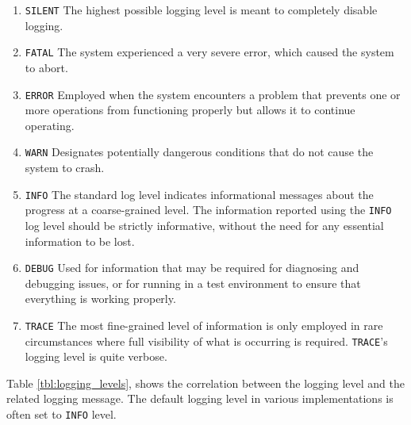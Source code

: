 \begin{enumerate}
  \item[\protect\icircled{\texttt{7}}] \texttt{SILENT}
    \newline
    The highest possible logging level is meant to completely disable logging.

  \item[\protect\icircled{\texttt{6}}] \texttt{FATAL}
    \newline
    The system experienced a very severe error, which caused the system to abort.

  \item[\protect\icircled{\texttt{5}}] \texttt{ERROR}
    \newline
    Employed when the system encounters a problem that prevents one or more operations
    from functioning properly but allows it to continue operating.

  \item[\protect\icircled{\texttt{4}}] \texttt{WARN}
    \newline
    Designates potentially dangerous conditions that do not cause the system to crash.

  \item[\protect\icircled{\texttt{3}}] \texttt{INFO}
    \newline
    The standard log level indicates informational messages about the progress at
    a coarse-grained level. The information reported using the \texttt{INFO} log
    level should be strictly informative, without the need for any essential
    information to be lost.

  \item[\protect\icircled{\texttt{2}}] \texttt{DEBUG}
    \newline
    Used for information that may be required for diagnosing and debugging issues,
    or for running in a test environment to ensure that everything is working
    properly.

  \item[\protect\icircled{\texttt{1}}] \texttt{TRACE}
    \newline
    The most fine-grained level of information is only employed in rare circumstances
    where full visibility of what is occurring is required. \texttt{TRACE}'s logging
    level is quite verbose.
\end{enumerate}

Table \ref{tbl:logging_levels}, shows the correlation between the logging level and
the related logging message. The default logging level in various
implementations is often set to \texttt{INFO} level.

